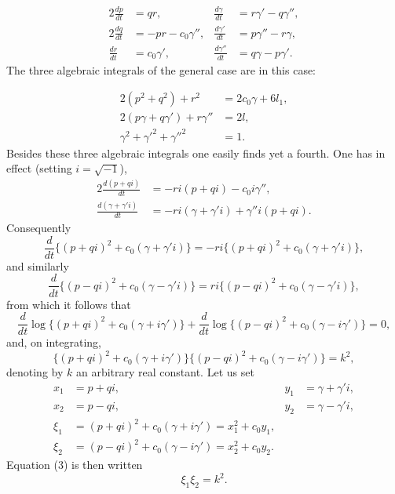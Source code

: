 \documentclass{article}
\begin{document}
\begin{equation}
\begin{aligned}
2\frac{dp}{dt} &= qr, & \frac{d\gamma}{dt} &= r\gamma' - q\gamma'', \\
2\frac{dq}{dt} &= -pr - c_0\gamma'', & \frac{d\gamma'}{dt} &= p\gamma'' - r\gamma, \\
\frac{dr}{dt} &= c_0\gamma', & \frac{d\gamma''}{dt} &= q\gamma - p\gamma'.
\end{aligned}
\end{equation}
The three algebraic integrals of the general case are in this case:

\begin{equation}
\begin{aligned}
2(p^2 + q^2) + r^2 &= 2c_0\gamma + 6l_1, \\
2(p\gamma + q\gamma') + r\gamma'' &= 2l, \\
\gamma^2 + \gamma'^2 + \gamma''^2 &= 1.
\end{aligned}
\end{equation}
Besides these three algebraic integrals one easily finds yet a fourth.
One has in effect (setting $i = \sqrt{-1}$),
\begin{align*}
2\frac{d(p + qi)}{dt} &= -ri(p + qi) - c_0i\gamma'', \\
\frac{d(\gamma + \gamma'i)}{dt} &= -ri(\gamma + \gamma'i) + \gamma''i(p + qi).
\end{align*}
Consequently
\[
\frac{d}{dt}\{(p + qi)^2 + c_0(\gamma + \gamma'i)\} = -ri\{(p + qi)^2 + c_0(\gamma + \gamma'i)\},
\]
and similarly
\[
\frac{d}{dt}\{(p - qi)^2 + c_0(\gamma - \gamma'i)\} = ri\{(p - qi)^2 + c_0(\gamma - \gamma'i)\},
\]
from which it follows that
\[
\frac{d}{dt}\log\{(p + qi)^2 + c_0(\gamma + i\gamma')\} + \frac{d}{dt}\log\{(p - qi)^2 + c_0(\gamma - i\gamma')\} = 0,
\]
and, on integrating,
\begin{equation}
\{(p + qi)^2 + c_0(\gamma + i\gamma')\}\{(p - qi)^2 + c_0(\gamma - i\gamma')\} = k^2,
\end{equation}
denoting by $k$ an arbitrary real constant.
Let us set
\begin{align*}
x_1 &= p + qi, & y_1 &= \gamma + \gamma'i, \\
x_2 &= p - qi, & y_2 &= \gamma - \gamma'i, \\
\xi_1 &= (p + qi)^2 + c_0(\gamma + i\gamma') = x_1^2 + c_0y_1, \\
\xi_2 &= (p - qi)^2 + c_0(\gamma - i\gamma') = x_2^2 + c_0y_2.
\end{align*}
Equation (3) is then written
\[
\xi_1\xi_2 = k^2.
\]
\end{document}
